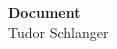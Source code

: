 \documentclass[letterpaper,10pt]{article}
\begin{document}
\begin{center}
	\Large \textbf{Document} \\
	\normalsize Tudor Schlanger
\end{center}
\end{document}
